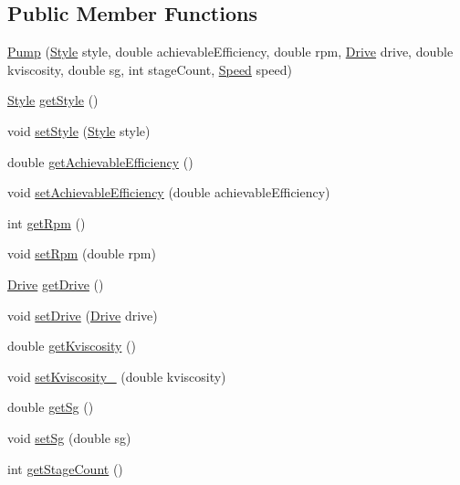 \subsection*{Public Member Functions}
\begin{DoxyCompactItemize}
\item 
\hyperlink{class_pump_a40479645281006efd81d3074f64d84ea}{Pump} (\hyperlink{class_pump_aef354601ce4218258cc898b35a1e90ff}{Style} style, double achievable\+Efficiency, double rpm, \hyperlink{class_pump_a32bf0ade131a11bb3b3fb374f638e983}{Drive} drive, double kviscosity, double sg, int stage\+Count, \hyperlink{class_pump_ae443603074ebca82f0b89209482d10b6}{Speed} speed)
\item 
\hyperlink{class_pump_aef354601ce4218258cc898b35a1e90ff}{Style} \hyperlink{class_pump_ab75d877769b5232c5ab7b4d92940579a}{get\+Style} ()
\item 
void \hyperlink{class_pump_a4852cb47f40a46ba84c7dff91d1abd53}{set\+Style} (\hyperlink{class_pump_aef354601ce4218258cc898b35a1e90ff}{Style} style)
\item 
double \hyperlink{class_pump_acf100af543142ab8404fc0ce2df1d157}{get\+Achievable\+Efficiency} ()
\item 
void \hyperlink{class_pump_a183f83fcc4b77e330451000df4d91046}{set\+Achievable\+Efficiency} (double achievable\+Efficiency)
\item 
int \hyperlink{class_pump_a66870deae37979d64a910b89c6977b26}{get\+Rpm} ()
\item 
void \hyperlink{class_pump_a7478d85c3b89cda275b039673603a785}{set\+Rpm} (double rpm)
\item 
\hyperlink{class_pump_a32bf0ade131a11bb3b3fb374f638e983}{Drive} \hyperlink{class_pump_a7eae412e42d0a3351408391cd5fbef4e}{get\+Drive} ()
\item 
void \hyperlink{class_pump_a54b6fc1aa44cc8377914ccb94738723a}{set\+Drive} (\hyperlink{class_pump_a32bf0ade131a11bb3b3fb374f638e983}{Drive} drive)
\item 
double \hyperlink{class_pump_a7b834ffb06cbfd643043e3a26ca1af6e}{get\+Kviscosity} ()
\item 
void \hyperlink{class_pump_a26d1d10908f91137f5148540ceb6520a}{set\+Kviscosity\+\_\+} (double kviscosity)
\item 
double \hyperlink{class_pump_ae30109b8533176cc1c7c80cf9df95631}{get\+Sg} ()
\item 
void \hyperlink{class_pump_a9b9773b74e0e56acece38107ab547728}{set\+Sg} (double sg)
\item 
int \hyperlink{class_pump_a2a8754f53b289dc41f3220adc4eb56e1}{get\+Stage\+Count} ()

\end{DoxyCompactItemize}
